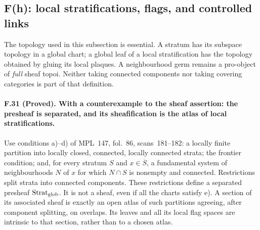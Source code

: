 \subsection{F(h): local stratifications, flags, and controlled links}

The topology used in this subsection is essential. A stratum has its
subspace topology in a global chart; a global leaf of a local
stratification has the topology obtained by gluing its local plaques.
A neighbourhood germ remains a pro-object of \emph{full} sheaf topoi.
Neither taking connected components nor taking covering categories is
part of that definition.

\paragraph{F.31 (Proved). With a counterexample to the sheaf assertion:
the presheaf is separated, and its sheafification is the atlas of local
stratifications.}
Use conditions a)--d) of MPL~147, fol.~86, scans~181--182: a locally
finite partition into locally closed, connected, locally connected strata;
the frontier condition; and, for every stratum $S$ and $x\in\overline S$,
a fundamental system of neighbourhoods $N$ of $x$ for which $N\cap S$
is nonempty and connected. Restrictions split strata into connected
components. These restrictions define a separated presheaf
$\operatorname{Strat}_{\rm glob}$. It is not a sheaf, even if all the
charts satisfy e). A section of its associated sheaf is exactly an open
atlas of such partitions agreeing, after component splitting, on
overlaps. Its leaves and all its local flag spaces are intrinsic to that
section, rather than to a chosen atlas.

